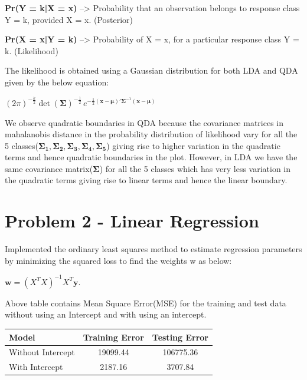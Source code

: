 \documentclass[12pt]{extarticle}
\begin{document}
\newline
\textbf{Pr(Y = k|X = x)} –> Probability that an observation belongs to response class Y = k, provided X = x. (Posterior) 

\textbf{Pr(X = x|Y = k)} –> Probability of X = x, for a particular response class Y = k. (Likelihood)

\vspace{3 mm}
The likelihood is obtained using a Gaussian distribution for both LDA and QDA given by the below equation:

\vspace{3 mm}

{\huge \textbf{${\displaystyle (2\pi )^{-{\frac {k}{2}}}\operatorname {det} ({\boldsymbol {\Sigma }})^{-{\frac {1}{2}}}\,e^{-{\frac {1}{2}}(\mathbf {x} -{\boldsymbol {\mu }})'{\boldsymbol {\Sigma }}^{-1}(\mathbf {x} -{\boldsymbol {\mu }})}}$}}

\vspace{5 mm}
We observe quadratic boundaries in QDA because the covariance matrices  in mahalanobis distance in the probability distribution of likelihood vary for all the 5 classes(${\boldsymbol {\Sigma_1 }},{\boldsymbol {\Sigma_2 }},{\boldsymbol {\Sigma_3 }},{\boldsymbol {\Sigma_4 }},{\boldsymbol {\Sigma_5 }}$) giving rise to higher variation in the quadratic terms and hence quadratic boundaries in the plot. However, in LDA we have the same covariance matrix(${\boldsymbol {\Sigma }}$) for all the 5 classes which has very less variation in the  quadratic terms giving rise to linear terms and hence the linear boundary.

\newpage
\section{Problem 2 - Linear Regression}

Implemented the ordinary least squares method to estimate regression parameters by minimizing the squared loss to find the weights {\boldsymbol  w } as below:

${\displaystyle {\boldsymbol  w }=(X^{T}X)^{-1}X^{T}{\boldsymbol {y}}.}$

\vspace{3 mm}
Above table contains Mean Square Error(MSE) for the training and test data without using an Intercept and with using an intercept.

\vspace{5mm}
\begin{tabularx}{\textwidth}{|X|c|c|}
\hline
\rowcolor[HTML]{FFCE93} 
Model & Training Error & Testing Error \\ \hline
Without Intercept & 19099.44 & 106775.36 \\ \hline
With Intercept & 2187.16 & 3707.84 \\ \hline
\end{tabularx}
\end{document}
